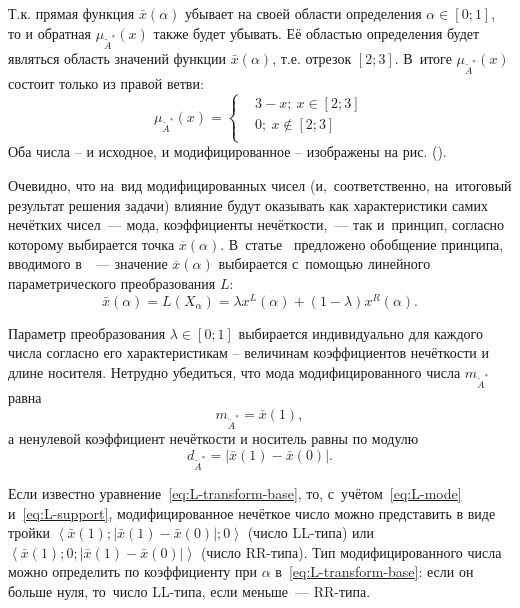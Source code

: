 Т.к. прямая функция $\bar{x}\left( \alpha  \right)$ убывает на своей области определения $\alpha \in \left[ 0;1 \right]$, то и обратная $\mu_{\tilde A^{*}}\left( x \right)$ также будет убывать. Её областью определения будет являться область значений функции $\bar{x}\left( \alpha  \right)$, т.е. отрезок $\left[ 2;3 \right]$. В~итоге $\mu_{\tilde A^{*}}\left( x \right)$ состоит только из правой ветви:
\begin{equation*}
	\mu_{\tilde A^{*}}\left( x \right)=\left\{
	\begin{aligned}
      & 3-x;\ x\in \left[ 2;3 \right] \\
      & 0;\ x\notin \left[ 2;3 \right] \\ 
    \end{aligned} \right.
\end{equation*}
Оба числа – и исходное, и модифицированное – изображены на рис. ().

Очевидно, что на~вид модифицированных чисел (и,~соответственно, на~итоговый результат решения задачи) влияние будут оказывать как характеристики самих нечётких чисел~--- мода, коэффициенты нечёткости,~--- так и~принцип, согласно которому выбирается точка $\overline{x}\left( \alpha  \right)$. В~статье~\cite{Vorontsov_PI} предложено обобщение принципа, вводимого в~\cite{Lebedev}~--- значение $\overline{x}\left( \alpha  \right)$ выбирается с~помощью линейного параметрического преобразования $L$:
\begin{equation}
  \label{eq:L-transform-base}
  \bar{x}\left( \alpha  \right)=L\left( X_\alpha \right)=\lambda x^L \left( \alpha  \right)+\left( 1-\lambda  \right) x^R \left( \alpha  \right).
\end{equation}

Параметр преобразования $\lambda \in \left[ 0;1 \right]$ выбирается индивидуально для каждого числа согласно его характеристикам – величинам коэффициентов нечёткости и длине носителя. Нетрудно убедиться, что мода модифицированного числа $m_{\tilde A^{*}}$ равна
\begin{equation}
\label{eq:L-mode}
  m_{\tilde A^{*}}=\bar{x}\left( 1 \right),
\end{equation}
а ненулевой коэффициент нечёткости и носитель равны по модулю
\begin{equation}
\label{eq:L-support}
  d_{\tilde A^{*}}=\left| \bar{x}\left( 1 \right)-\bar{x}\left( 0 \right) \right|.
\end{equation}

Если известно уравнение~\eqref{eq:L-transform-base}, то, с~учётом~\eqref{eq:L-mode} и~\eqref{eq:L-support}, модифицированное нечёткое число можно представить в виде тройки $\displaystyle \left\langle \bar{x}\left( 1 \right);\left| \bar{x}\left( 1 \right)-\bar{x}\left( 0 \right) \right|;0 \right\rangle$ (число LL-типа) или $\displaystyle \left\langle \bar{x}\left( 1 \right);0;\left| \bar{x}\left( 1 \right)-\bar{x}\left( 0 \right) \right| \right\rangle$ (число RR-типа). Тип модифицированного числа можно определить по коэффициенту при $\alpha$ в~\eqref{eq:L-transform-base}: если он больше нуля, то~число LL-типа, если меньше~--- RR-типа.

